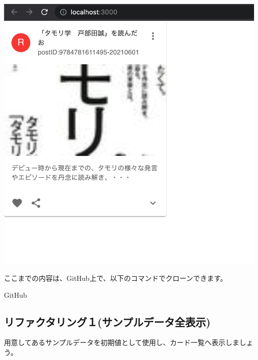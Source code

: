 \begin{reviewimage}%
\includegraphics[width=0.6\maxwidth]{./images/03-todo-with-react/sec00332-6.png}%
\label{image:03-todo-with-react:sec00332-6}
\end{reviewimage}
\begin{starternote}[]{}

ここまでの内容は、GitHub上で、以下のコマンドでクローンできます。

\def\startercodeblockfontsize{}
\begin{starterterminal}[]{GitHub}\end{starterterminal}
\end{starternote}

\subsection{リファクタリング１(サンプルデータ全表示)}
\keeplastskip{
  \label{sec:3-3-5}
  \label{sec-0333}
  \par\nobreak
}

用意してあるサンプルデータを初期値として使用し、カード一覧へ表示しましょう。

